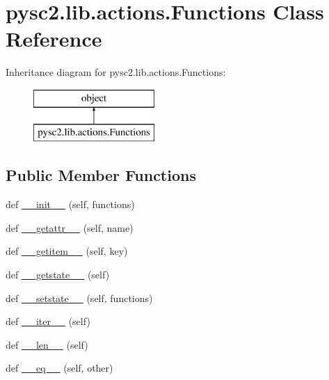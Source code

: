 \hypertarget{classpysc2_1_1lib_1_1actions_1_1_functions}{}\section{pysc2.\+lib.\+actions.\+Functions Class Reference}
\label{classpysc2_1_1lib_1_1actions_1_1_functions}
Inheritance diagram for pysc2.\+lib.\+actions.\+Functions\+:\begin{figure}[H]
\begin{center}
\leavevmode
\includegraphics[height=2.000000cm]{classpysc2_1_1lib_1_1actions_1_1_functions}
\end{center}
\end{figure}
\subsection*{Public Member Functions}
\begin{DoxyCompactItemize}
\item 
def \mbox{\hyperlink{classpysc2_1_1lib_1_1actions_1_1_functions_aed31349597035050c81dcd25e5a4e9db}{\+\_\+\+\_\+init\+\_\+\+\_\+}} (self, functions)
\item 
def \mbox{\hyperlink{classpysc2_1_1lib_1_1actions_1_1_functions_a4f7c465199f65341bb825bd63de76e7e}{\+\_\+\+\_\+getattr\+\_\+\+\_\+}} (self, name)
\item 
def \mbox{\hyperlink{classpysc2_1_1lib_1_1actions_1_1_functions_a3a39a75a47ed27754783141ae8089b40}{\+\_\+\+\_\+getitem\+\_\+\+\_\+}} (self, key)
\item 
def \mbox{\hyperlink{classpysc2_1_1lib_1_1actions_1_1_functions_a0b586278648ee7d86ab7636954e441c7}{\+\_\+\+\_\+getstate\+\_\+\+\_\+}} (self)
\item 
def \mbox{\hyperlink{classpysc2_1_1lib_1_1actions_1_1_functions_afeec98d7917f5f74ece2df8d52d53eb5}{\+\_\+\+\_\+setstate\+\_\+\+\_\+}} (self, functions)
\item 
def \mbox{\hyperlink{classpysc2_1_1lib_1_1actions_1_1_functions_ad17534c7035c7516b1605fbd15a9a0d7}{\+\_\+\+\_\+iter\+\_\+\+\_\+}} (self)
\item 
def \mbox{\hyperlink{classpysc2_1_1lib_1_1actions_1_1_functions_a1ec383fa6fb756cb62a584e86b9a756f}{\+\_\+\+\_\+len\+\_\+\+\_\+}} (self)
\item 
def \mbox{\hyperlink{classpysc2_1_1lib_1_1actions_1_1_functions_a44e72099c126871d34471a673b9d23db}{\+\_\+\+\_\+eq\+\_\+\+\_\+}} (self, other)
\end{DoxyCompactItemize}


